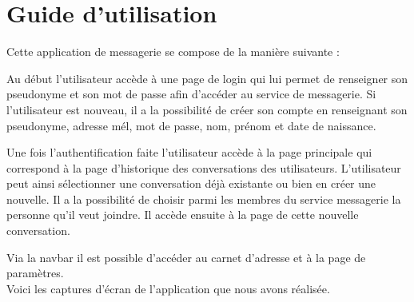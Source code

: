 \section{Guide d'utilisation}

\par Cette application de messagerie se compose de la manière suivante : \\

\par Au début l'utilisateur accède à une page de login qui lui permet de renseigner son pseudonyme et son mot de passe afin d'accéder au service de messagerie. Si l'utilisateur est nouveau, il a la possibilité de créer son compte en renseignant son pseudonyme, adresse mél, mot de passe, nom, prénom et date de naissance. 
\par Une fois l'authentification faite l'utilisateur accède à la page principale qui correspond à la page d'historique des conversations des utilisateurs. L'utilisateur peut ainsi sélectionner une conversation déjà existante ou bien en créer une nouvelle. Il a la possibilité de choisir parmi les membres du service messagerie la personne qu'il veut joindre. Il accède ensuite à la page de cette nouvelle conversation.
\par Via la navbar il est possible d'accéder au carnet d'adresse et à la page de paramètres. \\

Voici les captures d'écran de l'application que nous avons réalisée.



